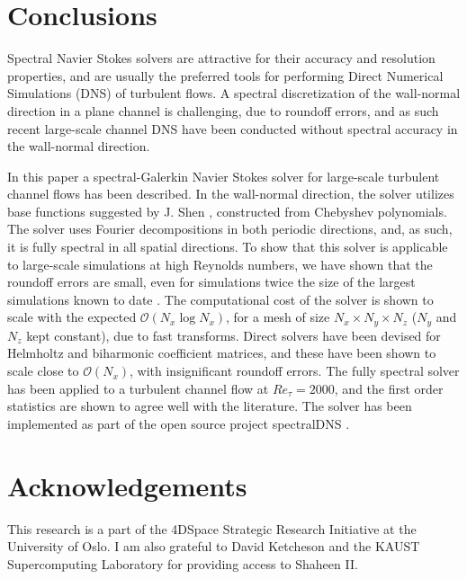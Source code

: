 \documentclass[preprint]{elsarticle}
\begin{document}
\section{Conclusions}
Spectral Navier Stokes solvers are attractive for their accuracy and resolution 
properties, and are usually the preferred tools for performing Direct Numerical 
Simulations (DNS) of turbulent flows. A spectral discretization of the wall-normal 
direction in a plane channel is challenging, due to roundoff errors, and as such recent large-scale channel DNS 
have been conducted without spectral accuracy in the wall-normal direction. 

In this paper a spectral-Galerkin Navier Stokes solver for large-scale turbulent channel flows 
has been described. In the wall-normal direction, the solver utilizes base 
functions 
suggested by J. Shen \cite{Shen95}, constructed from Chebyshev polynomials. The 
solver uses Fourier decompositions in both periodic directions, and, as such, 
it is fully spectral in all spatial directions. To show that this solver is 
applicable to large-scale simulations at high Reynolds numbers,  we have shown 
that the roundoff errors are small, even for simulations twice the size of the 
largest simulations known to date \cite{leemoser15}.
The computational cost of the solver is shown to scale with the expected 
$\mathcal{O}(N_x \log N_x)$, for a mesh of size $N_x \times N_y \times N_z$ ($N_y$ and $N_z$ kept constant), due to fast 
transforms. Direct 
solvers have been devised for Helmholtz and biharmonic coefficient matrices, 
and these have been shown to scale close to 
$\mathcal{O}(N_x)$, with insignificant roundoff errors. The fully spectral solver 
has been applied to a turbulent 
channel flow at $Re_{\tau}=2000$, and the first order statistics are shown to agree well with the literature. The solver has been implemented as part of the open source project spectralDNS \cite{spectralDNS}.

\section*{Acknowledgements}
This research is a part of the 4DSpace Strategic Research Initiative at the University of Oslo. I am also grateful to David Ketcheson and the KAUST Supercomputing Laboratory for providing access to Shaheen II.
\end{document}
